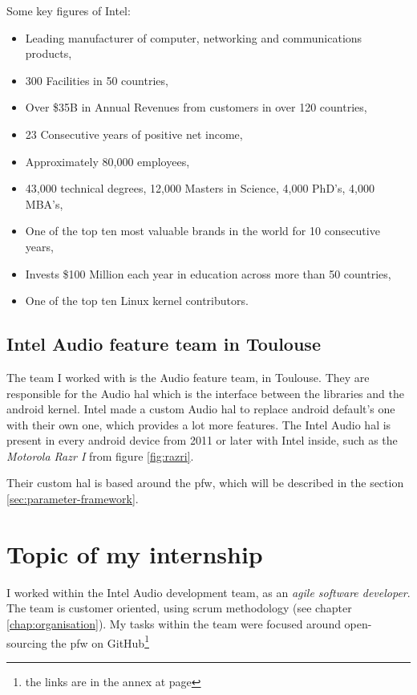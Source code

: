 Some key figures of Intel:
\begin{itemize}
\item Leading manufacturer of computer, networking and communications
  products,
  \item 300 Facilities in 50 countries,
  \item Over \$35B in Annual Revenues from customers in over 120
    countries,
\item 23 Consecutive years of positive net income,
\item Approximately 80,000 employees,
\item 43,000 technical degrees, 12,000 Masters in Science, 4,000
  PhD’s, 4,000 MBA’s,
  \item One of the top ten most valuable brands in the world for 10
    consecutive years,
\item Invests \$100 Million each year in education across more than 50
  countries,
\item One of the top ten Linux \gls{kernel} contributors.
\end{itemize}

\subsection{Intel Audio feature team in Toulouse}
The team I worked with is the Audio feature team, in Toulouse.
They are responsible for the Audio \gls{hal} which is the interface between the
libraries and the \gls{android} \gls{kernel}. Intel made a custom Audio \gls{hal} to
replace \gls{android} default's one with their own one, which provides a lot more features.
The Intel Audio \gls{hal} is present in every \gls{android} device from 2011 or later with Intel inside, such
as the \emph{Motorola Razr I} from figure \ref{fig:razri}.

Their custom \gls{hal} is based around the \gls{pfw}, which will be described in the section \ref{sec:parameter-framework}.


\section{Topic of my internship}
I worked within the Intel Audio development team, as an \emph{agile
software developer}. The team is customer oriented, using \gls{scrum}
methodology (see chapter \ref{chap:organisation}). My tasks
within the team were focused around open-sourcing the \gls{pfw} on
\gls{GitHub}\footnote{the links are in the annex at page \pageref{chap:annex}}



